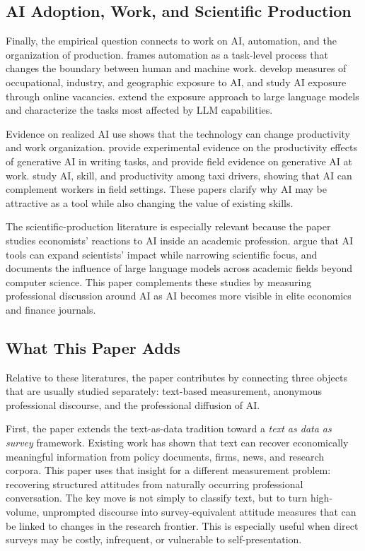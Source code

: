 \documentclass[11pt]{article}
\begin{document}
\subsection{AI Adoption, Work, and Scientific Production}

Finally, the empirical question connects to work on AI, automation, and the organization of production. \citet{autor2015} frames automation as a task-level process that changes the boundary between human and machine work. \citet{felten2021} develop measures of occupational, industry, and geographic exposure to AI, and \citet{acemoglu2022} study AI exposure through online vacancies. \citet{eloundou2023} extend the exposure approach to large language models and characterize the tasks most affected by LLM capabilities.

Evidence on realized AI use shows that the technology can change productivity and work organization. \citet{noy2023} provide experimental evidence on the productivity effects of generative AI in writing tasks, and \citet{brynjolfsson2025} provide field evidence on generative AI at work. \citet{kanazawa2025} study AI, skill, and productivity among taxi drivers, showing that AI can complement workers in field settings. These papers clarify why AI may be attractive as a tool while also changing the value of existing skills.

The scientific-production literature is especially relevant because the paper studies economists' reactions to AI inside an academic profession. \citet{hao2025} argue that AI tools can expand scientists' impact while narrowing scientific focus, and \citet{pramanick2026} documents the influence of large language models across academic fields beyond computer science. This paper complements these studies by measuring professional discussion around AI as AI becomes more visible in elite economics and finance journals.

\subsection{What This Paper Adds}

Relative to these literatures, the paper contributes by connecting three objects that are usually studied separately: text-based measurement, anonymous professional discourse, and the professional diffusion of AI.

First, the paper extends the text-as-data tradition toward a \textit{text as data as survey} framework. Existing work has shown that text can recover economically meaningful information from policy documents, firms, news, and research corpora. This paper uses that insight for a different measurement problem: recovering structured attitudes from naturally occurring professional conversation. The key move is not simply to classify text, but to turn high-volume, unprompted discourse into survey-equivalent attitude measures that can be linked to changes in the research frontier. This is especially useful when direct surveys may be costly, infrequent, or vulnerable to self-presentation.
\end{document}
